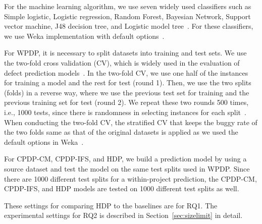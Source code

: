 For the machine learning algorithm, we use seven widely used classifiers such as Simple logistic, Logistic regression, Random Forest, Bayesian Network, Support vector machine, J48 decision tree, and Logistic model tree~\cite{DAmbros12,Ghotra15,Lee11,Lessmann08,Nam13,Song11,Ghotra15}.
For these classifiers, we use Weka implementation with default
options~\cite{Weka}.

For WPDP, it is necessary to split datasets into training and test
sets. We use the two-fold cross validation (CV), which is widely used in the evaluation of
defect prediction models~\cite{Klas2010,Nam13,Pinzger2008}. In the two-fold CV, we use one half of the instances for training a model and the rest for
test (round 1). Then, we use the two splits (folds) in a reverse way, where we
use the previous test set for training and the previous training set for test
(round 2). We repeat these two rounds 500 times, i.e., 1000 tests, since there
is randomness in selecting instances for each split~\cite{Arcuri11}. When conducting the two-fold CV, the stratified CV that keeps the buggy rate of the two folds same as that of the original datasets is applied as we used the default options in Weka~\cite{Weka}.

For CPDP-CM, CPDP-IFS, and HDP, we build a
prediction model by using a source dataset and test the model on the same test
splits used in WPDP. Since there are 1000 different test
splits for a within-project prediction, the CPDP-CM, CPDP-IFS, and HDP models
are tested on 1000 different test splits as well.

These settings for comparing HDP to the baselines are for RQ1. The experimental settings for RQ2 is described in Section~\ref{sec:sizelimit} in detail.

